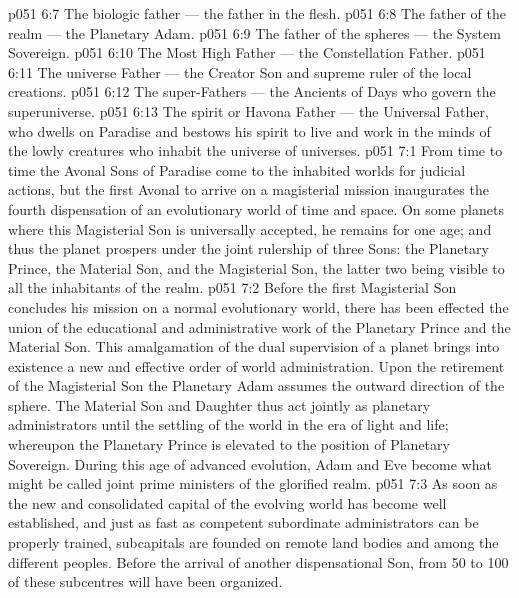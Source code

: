 \vs p051 6:7 \bibnobreakspace The biologic father --- the father in the flesh.
\vs p051 6:8 \bibnobreakspace The father of the realm --- the Planetary Adam.
\vs p051 6:9 \bibnobreakspace The father of the spheres --- the System Sovereign.
\vs p051 6:10 \bibnobreakspace The Most High Father --- the Constellation Father.
\vs p051 6:11 \bibnobreakspace The universe Father --- the Creator Son and supreme ruler of the local creations.
\vs p051 6:12 \bibnobreakspace The super\hyp{}Fathers --- the Ancients of Days who govern the superuniverse.
\vs p051 6:13 \bibnobreakspace The spirit or Havona Father --- the Universal Father, who dwells on Paradise and bestows his spirit to live and work in the minds of the lowly creatures who inhabit the universe of universes.
\vs p051 7:1 From time to time the Avonal Sons of Paradise come to the inhabited worlds for judicial actions, but the first Avonal to arrive on a magisterial mission inaugurates the fourth dispensation of an evolutionary world of time and space. On some planets where this Magisterial Son is universally accepted, he remains for one age; and thus the planet prospers under the joint rulership of three Sons: the Planetary Prince, the Material Son, and the Magisterial Son, the latter two being visible to all the inhabitants of the realm.
\vs p051 7:2 Before the first Magisterial Son concludes his mission on a normal evolutionary world, there has been effected the union of the educational and administrative work of the Planetary Prince and the Material Son. This amalgamation of the dual supervision of a planet brings into existence a new and effective order of world administration. Upon the retirement of the Magisterial Son the Planetary Adam assumes the outward direction of the sphere. The Material Son and Daughter thus act jointly as planetary administrators until the settling of the world in the era of light and life; whereupon the Planetary Prince is elevated to the position of Planetary Sovereign. During this age of advanced evolution, Adam and Eve become what might be called joint prime ministers of the glorified realm.
\vs p051 7:3 As soon as the new and consolidated capital of the evolving world has become well established, and just as fast as competent subordinate administrators can be properly trained, subcapitals are founded on remote land bodies and among the different peoples. Before the arrival of another dispensational Son, from 50 to 100 of these subcentres will have been organized.
